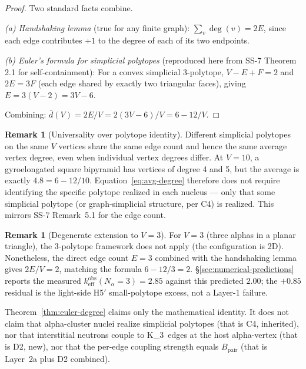 \documentclass[11pt,letterpaper]{article}
\theoremstyle{definition}
\newtheorem{remark}[theorem]{Remark}
\newcommand{\Bpair}{B_{\text{pair}}}
\newcommand{\Nalpha}{N_\alpha}
\newcommand{\Kthree}{K_3}
\newcommand{\degv}{\deg(v)}
\begin{document}
\begin{proof}
Two standard facts combine.

\emph{(a) Handshaking lemma} (true for any finite graph): $\sum_v \degv = 2E$, since each edge contributes $+1$ to the degree of each of its two endpoints.

\emph{(b) Euler's formula for simplicial polytopes} (reproduced here from SS-7 Theorem 2.1 for self-containment): For a convex simplicial 3-polytope, $V - E + F = 2$ and $2E = 3F$ (each edge shared by exactly two triangular faces), giving $E = 3(V - 2) = 3V - 6$.

Combining: $\bar{d}(V) = 2E/V = 2(3V-6)/V = 6 - 12/V$.
\end{proof}

\begin{remark}[Universality over polytope identity]
\label{rem:universality}
Different simplicial polytopes on the same $V$ vertices share the same edge count and hence the same average vertex degree, even when individual vertex degrees differ. At $V = 10$, a gyroelongated square bipyramid has vertices of degree 4 and 5, but the average is exactly $4.8 = 6 - 12/10$. Equation~\eqref{eq:avg-degree} therefore does not require identifying the specific polytope realized in each nucleus --- only that some simplicial polytope (or graph-simplicial structure, per C4) is realized. This mirrors SS-7 Remark~5.1 for the edge count.
\end{remark}

\begin{remark}[Degenerate extension to $V = 3$]
\label{rem:v3}
For $V = 3$ (three alphas in a planar triangle), the 3-polytope framework does not apply (the configuration is 2D). Nonetheless, the direct edge count $E = 3$ combined with the handshaking lemma gives $2E/V = 2$, matching the formula $6 - 12/3 = 2$. \S\ref{sec:numerical-predictions} reports the measured $k_{\text{eff}}^{\text{obs}}(\Nalpha = 3) = 2.85$ against this predicted $2.00$; the $+0.85$ residual is the light-side H5$'$ small-polytope excess, not a Layer-1 failure.
\end{remark}

Theorem~\ref{thm:euler-degree} claims only the mathematical identity. It does not claim that alpha-cluster nuclei realize simplicial polytopes (that is C4, inherited), nor that interstitial neutrons couple to \Kthree\ edges at the host alpha-vertex (that is D2, new), nor that the per-edge coupling strength equals $\Bpair$ (that is Layer~2a plus D2 combined).
\end{document}
